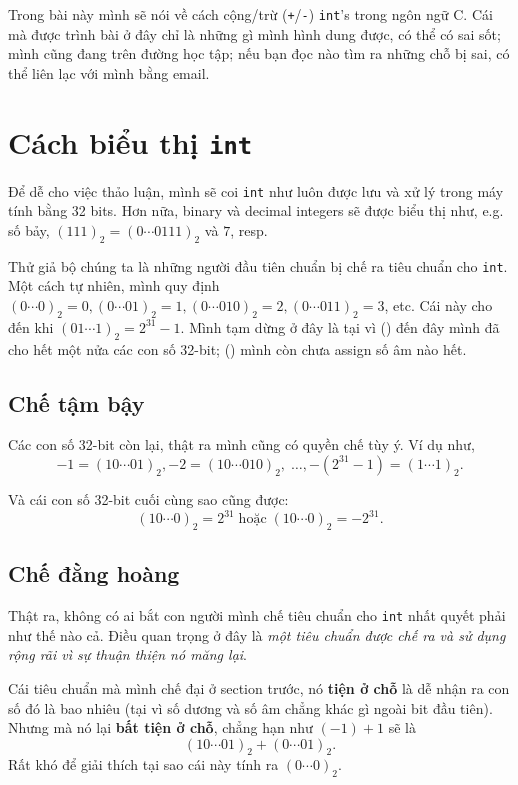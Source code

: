 \documentclass{article}
\begin{document}
Trong bài này mình sẽ nói về cách cộng/trừ (\texttt{+}/\texttt{-}) \texttt{int}'s trong ngôn ngữ C. Cái mà được trình bài ở đây chỉ là những gì mình hình dung được, có thể có sai sốt; mình cũng đang trên đường học tập; nếu bạn đọc nào tìm ra những chỗ bị sai, có thể liên lạc với mình bằng email.

\section{Cách biểu thị \texttt{int}}
Để dễ cho việc thảo luận, mình sẽ coi \texttt{int} như luôn được lưu và xử lý trong máy tính bằng 32 bits. Hơn nữa, binary và decimal integers sẽ được biểu thị như, e.g. số bảy, $(111)_{2} = (0\cdots0111)_{2}$ và $7$, resp.

Thử giả bộ chúng ta là những người đầu tiên chuẩn bị chế ra tiêu chuẩn cho \texttt{int}.
Một cách tự nhiên, mình quy định $(0\cdots0)_{2} = 0, (0\cdots01)_{2} = 1, (0\cdots010)_{2} = 2, (0\cdots011)_{2} = 3$, etc. Cái này cho đến khi $(01\cdots1)_{2} = 2^{31} - 1$. Mình tạm dừng ở đây là tại vì () đến đây mình đã cho hết một nửa các con số 32-bit; () mình còn chưa assign số âm nào hết.
\subsection{Chế tậm bậy}
Các con số 32-bit còn lại, thật ra mình cũng có quyền chế tùy ý. Ví dụ như, 
$$-1 = (10\cdots01)_{2}, -2 = (10\cdots010)_{2},\;\ldots, -(2^{31} - 1) = (1\cdots1)_{2}.$$

Và cái con số 32-bit cuối cùng sao cũng được:
$$(10\cdots0)_{2} = 2^{31} \;\textrm{hoặc}\; (10\cdots0)_{2} = -2^{31}.$$

\subsection{Chế đằng hoàng}
Thật ra, không có ai bắt con người mình chế tiêu chuẩn cho \texttt{int} nhất quyết phải như thế nào cả. Điều quan trọng ở đây là \textit{một tiêu chuẩn được chế ra và sử dụng rộng rãi vì sự thuận thiện nó măng lại}.

Cái tiêu chuẩn mà mình chế đại ở section trước, nó \textbf{tiện ở chỗ} là dễ nhận ra con số đó là bao nhiêu (tại vì số dương và số âm chẳng khác gì ngoài bit đầu tiên). Nhưng mà nó lại \textbf{bất tiện ở chỗ}, chẳng hạn như $(-1) + 1$ sẽ là
$$(10\cdots01)_{2} + (0\cdots01)_{2}.$$
Rất khó để giải thích tại sao cái này tính ra $(0\cdots0)_{2}$.
\end{document}
